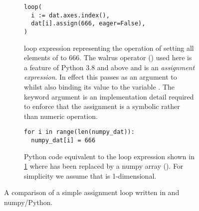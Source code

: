 \documentclass[thesis]{subfiles}
\begin{document}
\begin{figure}[h]
  \centering
  \begin{subfigure}[t]{.48\textwidth}
    \centering
    \begin{verbatim}
loop(
  i := dat.axes.index(),
  dat[i].assign(666, eager=False),
)
    \end{verbatim}
    \caption{
       loop expression representing the operation of setting all elements of  to 666.
      The walrus operator (\pycode{:=}) used here is a feature of Python 3.8 and above and is an \textit{assignment expression}.
      In effect this passes  as an argument to  whilst also binding its value to the variable .
      The keyword argument  is an implementation detail required to enforce that the assignment is a symbolic rather than numeric operation.
    }
    \label{fig:simple_loop_pyop3}
  \end{subfigure}
  \hfill
  \begin{subfigure}[t]{.48\textwidth}
    \centering
    \begin{verbatim}
for i in range(len(numpy_dat)):
  numpy_dat[i] = 666

    \end{verbatim}
    \caption{
      Python code equivalent to the loop expression shown in \ref{fig:simple_loop_pyop3} where  has been replaced by a numpy array ().
      For simplicity we assume that  is 1-dimensional.
    }
    \label{fig:simple_loop_python}
  \end{subfigure}

  \caption{A comparison of a simple assignment loop written in  and numpy/Python.}
  \label{fig:simple_loop}
\end{figure}
\end{document}
